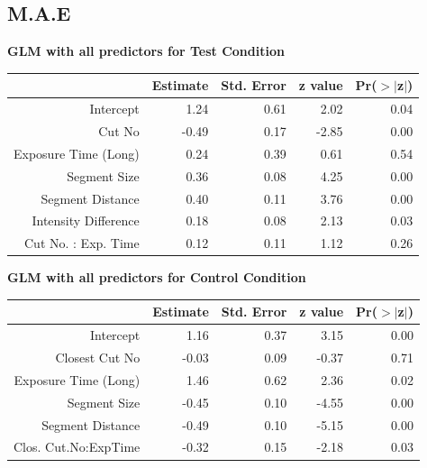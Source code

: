 \documentclass{article}
\begin{document}
\subsection*{M.A.E}
\textbf{GLM with all predictors for Test Condition}
\begin{table}[ht]
\centering
\begin{tabular}{rrrrr}
  \hline
 & Estimate & Std. Error & z value & Pr($>$$|$z$|$) \\ 
  \hline
Intercept & 1.24 & 0.61 & 2.02 & 0.04 \\ 
  Cut No & -0.49 & 0.17 & -2.85 & 0.00 \\ 
  Exposure Time (Long) & 0.24 & 0.39 & 0.61 & 0.54 \\ 
  Segment Size & 0.36 & 0.08 & 4.25 & 0.00 \\ 
  Segment Distance & 0.40 & 0.11 & 3.76 & 0.00 \\ 
  Intensity Difference & 0.18 & 0.08 & 2.13 & 0.03 \\ 
  Cut No. : Exp. Time & 0.12 & 0.11 & 1.12 & 0.26 \\ 
   \hline
\end{tabular}
\end{table}

\textbf{GLM with all predictors for Control Condition}
\begin{table}[ht]
\centering
\begin{tabular}{rrrrr}
  \hline
 & Estimate & Std. Error & z value & Pr($>$$|$z$|$) \\ 
  \hline
Intercept & 1.16 & 0.37 & 3.15 & 0.00 \\ 
  Closest Cut No & -0.03 & 0.09 & -0.37 & 0.71 \\ 
  Exposure Time (Long) & 1.46 & 0.62 & 2.36 & 0.02 \\ 
  Segment Size & -0.45 & 0.10 & -4.55 & 0.00 \\ 
  Segment Distance & -0.49 & 0.10 & -5.15 & 0.00 \\ 
  Clos. Cut.No:ExpTime & -0.32 & 0.15 & -2.18 & 0.03 \\ 
   \hline
\end{tabular}
\end{table}
\clearpage
\end{document}
